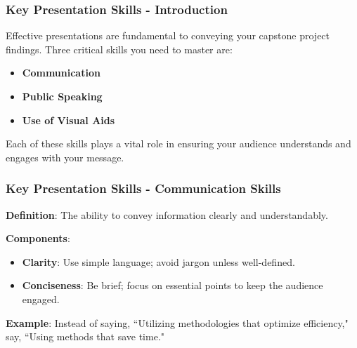\documentclass{beamer}
\begin{document}
\begin{frame}[fragile]
    \frametitle{Key Presentation Skills - Introduction}
    Effective presentations are fundamental to conveying your capstone project findings. 
    Three critical skills you need to master are:
    \begin{itemize}
        \item \textbf{Communication}
        \item \textbf{Public Speaking}
        \item \textbf{Use of Visual Aids}
    \end{itemize}
    Each of these skills plays a vital role in ensuring your audience understands and engages with your message.
\end{frame}

\begin{frame}[fragile]
    \frametitle{Key Presentation Skills - Communication Skills}
    \textbf{Definition}: The ability to convey information clearly and understandably.

    \textbf{Components}:
    \begin{itemize}
        \item \textbf{Clarity}: Use simple language; avoid jargon unless well-defined.
        \item \textbf{Conciseness}: Be brief; focus on essential points to keep the audience engaged.
    \end{itemize}

    \textbf{Example}: Instead of saying, ``Utilizing methodologies that optimize efficiency," say, ``Using methods that save time."
\end{frame}
\end{document}
